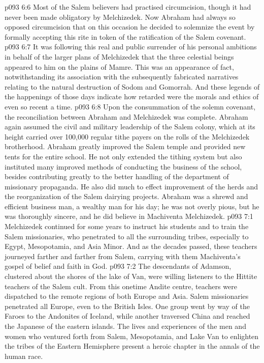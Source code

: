 \vs p093 6:6 Most of the Salem believers had practised circumcision, though it had never been made obligatory by Melchizedek. Now Abraham had always so opposed circumcision that on this occasion he decided to solemnize the event by formally accepting this rite in token of the ratification of the Salem covenant.
\vs p093 6:7 It was following this real and public surrender of his personal ambitions in behalf of the larger plans of Melchizedek that the three celestial beings appeared to him on the plains of Mamre. This was an appearance of fact, notwithstanding its association with the subsequently fabricated narratives relating to the natural destruction of Sodom and Gomorrah. And these legends of the happenings of those days indicate how retarded were the morals and ethics of even so recent a time.
\vs p093 6:8 Upon the consummation of the solemn covenant, the reconciliation between Abraham and Melchizedek was complete. Abraham again assumed the civil and military leadership of the Salem colony, which at its height carried over 100,000 regular tithe payers on the rolls of the Melchizedek brotherhood. Abraham greatly improved the Salem temple and provided new tents for the entire school. He not only extended the tithing system but also instituted many improved methods of conducting the business of the school, besides contributing greatly to the better handling of the department of missionary propaganda. He also did much to effect improvement of the herds and the reorganization of the Salem dairying projects. Abraham was a shrewd and efficient business man, a wealthy man for his day; he was not overly pious, but he was thoroughly sincere, and he did believe in Machiventa Melchizedek.
\vs p093 7:1 Melchizedek continued for some years to instruct his students and to train the Salem missionaries, who penetrated to all the surrounding tribes, especially to Egypt, Mesopotamia, and Asia Minor. And as the decades passed, these teachers journeyed farther and farther from Salem, carrying with them Machiventa’s gospel of belief and faith in God.
\vs p093 7:2 The descendants of Adamson, clustered about the shores of the lake of Van, were willing listeners to the Hittite teachers of the Salem cult. From this onetime Andite centre, teachers were dispatched to the remote regions of both Europe and Asia. Salem missionaries penetrated all Europe, even to the British Isles. One group went by way of the Faroes to the Andonites of Iceland, while another traversed China and reached the Japanese of the eastern islands. The lives and experiences of the men and women who ventured forth from Salem, Mesopotamia, and Lake Van to enlighten the tribes of the Eastern Hemisphere present a heroic chapter in the annals of the human race.
